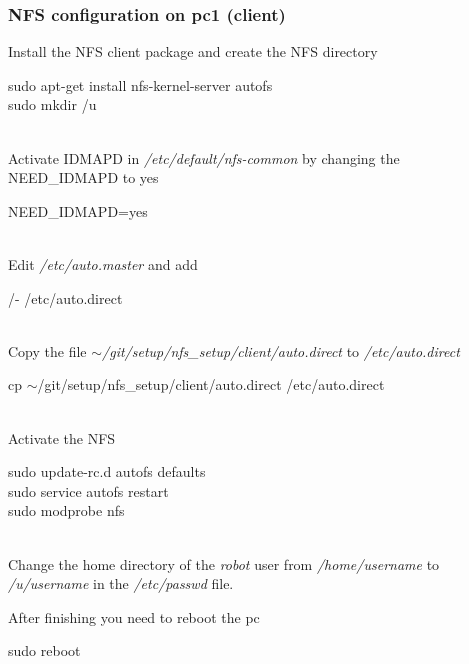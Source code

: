 \subsubsection{NFS configuration on pc1 (client)}
Install the NFS client package and create the NFS directory

\colorbox{light-gray}{
\begin{minipage}{1.0\textwidth} 
	sudo apt-get install nfs-kernel-server autofs \\
	sudo mkdir /u
\end{minipage} } \\

Activate IDMAPD in \textit{/etc/default/nfs-common} by changing the NEED\_IDMAPD to yes

\colorbox{light-gray}{
\begin{minipage}{1.0\textwidth} 
	NEED\_IDMAPD=yes
\end{minipage} } \\

Edit \textit{/etc/auto.master} and add

\colorbox{light-gray}{
\begin{minipage}{1.0\textwidth} 
	/-	/etc/auto.direct
\end{minipage} } \\

Copy the file \textit{$\sim$/git/setup/nfs\_setup/client/auto.direct} to \textit{/etc/auto.direct}

\colorbox{light-gray}{
\begin{minipage}{1.0\textwidth} 
	cp $\sim$/git/setup/nfs\_setup/client/auto.direct /etc/auto.direct
\end{minipage} } \\

Activate the NFS

\colorbox{light-gray}{
\begin{minipage}{1.0\textwidth}
	sudo update-rc.d autofs defaults\\
	sudo service autofs restart	\\
	sudo modprobe nfs
\end{minipage} } \\

Change the home directory of the \textit{robot} user from \textit{/home/username} to \textit{/u/username} in the \textit{/etc/passwd} file.

After finishing you need to reboot the pc

\colorbox{light-gray}{
\begin{minipage}{1.0\textwidth} 
	sudo reboot
\end{minipage} } \\

